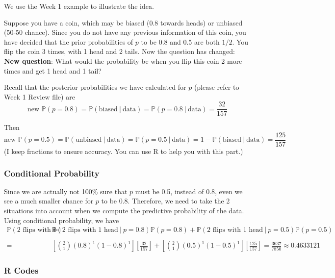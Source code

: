 \documentclass{article}
\begin{document}
We use the Week 1 example to illustrate the idea. 

\begin{displayquote}
	Suppose you have a coin, which may be biased (0.8 towards heads) or unbiased (50-50 chance). Since you do not have any previous information of this coin, you have decided that the prior probabilities of $p$ to be 0.8 and 0.5 are both $1/2$. You flip the coin 3 times, with 1 head and 2 tails. Now the question has changed:\\
	
	\textbf{New question}: What would the probability be when you flip this coin 2 more times and get 1 head and 1 tail?
\end{displayquote}

Recall that the posterior probabilities we have calculated for $p$ (please refer to Week 1 Review file) are
$$ \text{new }\mathbb{P}(p = 0.8) = \mathbb{P}(\text{biased}~|~\text{data}) = \mathbb{P}(p = 0.8~|~\text{data}) = \frac{32}{157} $$

Then
$$ \text{new }\mathbb{P}(p = 0.5)=\mathbb{P}(\text{unbiased}~|~\text{data}) = \mathbb{P}(p = 0.5~|~\text{data}) = 1 - \mathbb{P}(\text{biased}~|~\text{data}) = \frac{125}{157} $$
(I keep fractions to ensure accuracy. You can use R to help you with this part.)

\subsubsection*{Conditional Probability}

Since we are actually not 100\% sure that $p$ must be 0.5, instead of 0.8, even we see a much smaller chance for $p$ to be 0.8. Therefore, we need to take the 2 situations into account when we compute the predictive probability of the data. Using conditional probability, we have
\begin{align*}
\mathbb{P}(\text{2 flips with 1 head}) = & \mathbb{P}(\text{2 flips with 1 head}~|~p=0.8)\mathbb{P}(p=0.8) + \mathbb{P}(\text{2 flips with 1 head}~|~p=0.5)\mathbb{P}(p=0.5)\\
& \\
= & \left[\binom{2}{1}(0.8)^1(1-0.8)^1\right]\left[\frac{32}{157}\right]+\left[\binom{2}{1}(0.5)^1(1-0.5)^1\right]\left[\frac{125}{157}\right] = \frac{3637}{7850}\approx 0.4633121	
\end{align*} 

\subsubsection*{R Codes}
\end{document}
